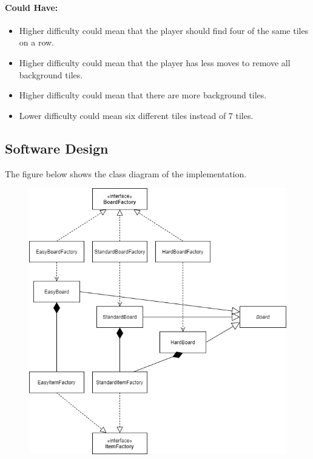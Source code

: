 \documentclass{article}
\begin{document}
\paragraph{Could Have:}
\begin{itemize}
	\item Higher difficulty could mean that the player should find four of the same tiles on a row.
	\item Higher difficulty could mean that the player has less moves to remove all background tiles.
	\item Higher difficulty could mean that there are more background tiles. 
	\item Lower difficulty could mean six different tiles instead of 7 tiles.
\end{itemize}


\newpage
\subsection{Software Design}
The figure below shows the class diagram of the implementation.
\begin{figure}[H]
\includegraphics[scale=0.55]{Images/DifficultiesClassDiagram.jpg}
\end{figure}
\end{document}
